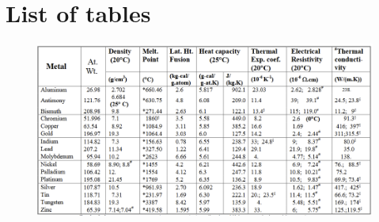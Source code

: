 \documentclass[final]{cubedoc}
\begin{document}





\section{List of tables}\label{list_tables}



\begin{figure}[h!]
    \centering
    \includegraphics[width=\linewidth]{docs/mist_heat_capacity.png}
    \caption{\cite[p.37]{solder}}
    \label{fig:my_label}
\end{figure}
\end{document}
